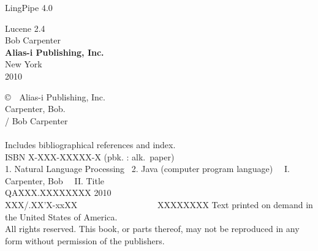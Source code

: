 \documentclass[11pt]{book}
\begin{document}
\setcounter{chapter}{0}
\setcounter{section}{0}
\pagestyle{empty}

\cleardoublepage
\vspace*{2.375in}
\begin{center}
{\hfill {\Huge LingPipe 4.0}}
\end{center}


\cleardoublepage
\vspace*{1.125in}
\begin{center}
{\hfill {\fontsize{70}{100}\selectfont Lucene 2.4}}
\\[0.75in]
{\hfill {\Huge Bob Carpenter}}
\\[-1pt]
\vfill
{\hfill {\large\bf Alias-i Publishing, Inc.}}
\\[1pt]
{\hfill {\small New York}}
\\[-1pt]
{\hfill {\small 2010}}
\end{center}

\clearpage
\vspace*{1.25in}
\noindent
{\footnotesize%
\copyright \ \ Alias-i Publishing, Inc.
\hfill
\vfill
\vfill
{}
\\[6pt]
Carpenter, Bob.
\\
\hspace*{0.125in}{\it Lingpipe 4.0} / Bob Carpenter
\\
\hspace*{.5in}{p. cm.}
\\
\hspace*{0.125in}Includes bibliographical references and index.
\\
\hspace*{0.125in}ISBN X-XXX-XXXXX-X (pbk. : alk.~paper)
\\[4pt]
1. Natural Language Processing  \ 2. Java (computer program language) \ \ I. Carpenter, Bob \ \ II. Title
\\[2pt]
\hspace*{0.125in}QAXXX.XXXXXXXX 2010
\\[2pt]
\hspace*{0.125in}XXX/.XX'X-xxXX      \ \ \ \ \ \ \ \ \ \ \ \ \ \ \ \ \  \ XXXXXXXX
\vfill
\noindent
Text printed on demand in the United States of America.
\\[12pt]
All rights reserved. This book, or parts thereof, may not
be reproduced in any form without permission of the publishers.
}
\end{document}
